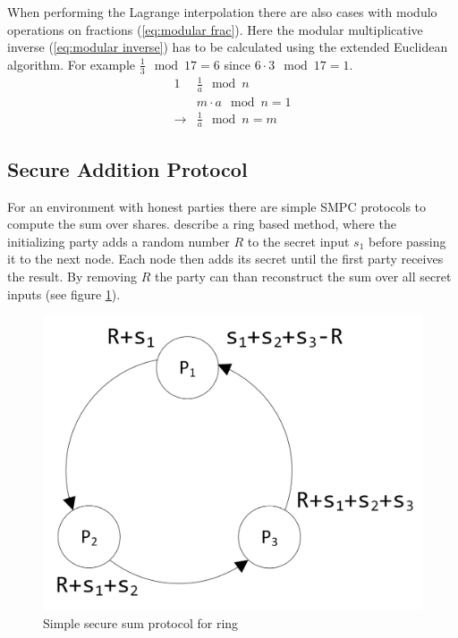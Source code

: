 When performing the Lagrange interpolation there are also cases with modulo operations on fractions (\autoref{eq:modular frac}). Here the modular multiplicative inverse (\autoref{eq:modular inverse}) has to be calculated using the extended Euclidean algorithm. For example $\frac{1}{3}\mod 17=6$ since $6\cdot 3\mod 17=1$.
\begin{alignat}{1}
& \frac{1}{a}\mod n \label{eq:modular frac} \\
& m\cdot a\mod n=1 \label{eq:modular inverse} \\
 \rightarrow & \frac{1}{a}\mod n=m \label{eq:modular frac result}
\end{alignat}

\subsection{Secure Addition Protocol} \label{Secure Addition Protocol}

For an environment with honest parties there are simple \gls{SMPC} protocols to compute the sum over shares. \textcite{Clifton2002} describe a ring based method, where the initializing party adds a random number $R$ to the secret input $s_1$ before passing it to the next node. Each node then adds its secret until the first party receives the result. By removing $R$ the party can than reconstruct the sum over all secret inputs (see figure \ref{figure:smpc sum ring}).

\begin{figure}[!htb] %
	\caption{Simple secure sum protocol for ring} \label{figure:smpc sum ring}
	\includegraphics[scale=1.0]{figures/smpc-sum-simple-ring.png}
\end{figure}

